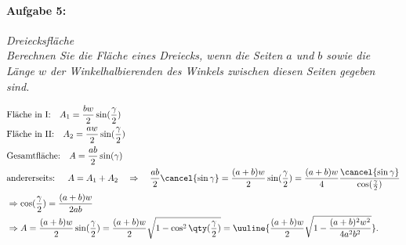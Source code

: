 \newpage
\paragraph{Aufgabe 5: } \emph{Dreiecksfläche}\\[0.2cm]
\emph{Berechnen Sie die Fläche eines Dreiecks, wenn die Seiten $a$ und $b$ sowie die Länge $w$ der Winkelhalbierenden des Winkels zwischen diesen Seiten gegeben sind.}

\begin{wrapfigure}{r}{6cm}
    \centering
    \vspace{-5mm}
    \vspace{-5mm}
\end{wrapfigure}

\begin{align}
    &\text{Fläche in I:} \quad A_1 = \frac{bw}{2} \sin(\frac{\gamma}{2})\\
    &\text{Fläche in II:} \quad A_2 = \frac{aw}{2} \sin(\frac{\gamma}{2})\\
    &\text{Gesamtfläche:} \quad A = \frac{ab}{2} \sin(\gamma) \\
    &\text{andererseits: } \quad A= A_1 + A_2  \quad \Rightarrow \quad \frac{ab}{2}\cancel{\sin\gamma} = \frac{(a+b)w}{2} \sin(\frac{\gamma}{2}) = \frac{(a+b)w}{4} \frac{\cancel{\sin\gamma}}{\cos(\frac{\gamma}{2})} \\
    &\Rightarrow \cos(\frac{\gamma}{2}) = \frac{(a+b)w}{2ab} \\
    & \Rightarrow A = \frac{(a+b)w}{2} \sin(\frac{\gamma}{2}) =\frac{(a+b)w}{2}\sqrt{1-\cos^2\qty(\frac{\gamma}{2})} = \uuline{\frac{(a+b)w}{2}\sqrt{1-\frac{(a+b)^2 w^2}{4a^2b^2}}}.
\end{align}